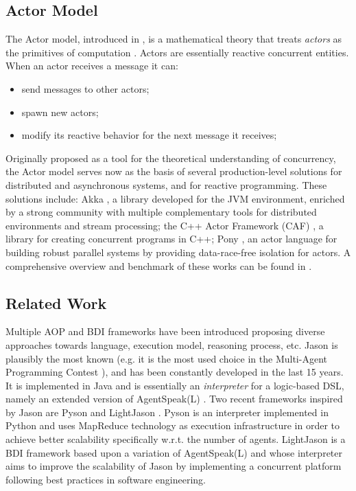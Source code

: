 \subsection{Actor Model}
The Actor model, introduced in \cite{Hewitt}, is a mathematical theory that treats \textit{actors} as the primitives of computation \cite{hewitt2010actor}. Actors are essentially reactive concurrent entities. %
When an actor receives a message it can: %
\begin{itemize}[noitemsep]
    \item send messages to other actors;
    \item spawn new actors;
    \item modify its reactive behavior for the next message it receives;
\end{itemize}
\noindent Originally proposed as a tool for the theoretical understanding of concurrency, the Actor model serves now as the basis of several production-level solutions for distributed and asynchronous systems, and for reactive programming. These solutions include: Akka \cite{AKKA}, a library developed for the JVM environment, enriched by a strong community with multiple complementary tools for distributed environments and stream processing; the C++ Actor Framework (CAF) \cite{CAF}, a library %
for creating concurrent programs in C++; Pony \cite{PONY1,PONY2}, an actor language for building robust parallel systems by providing data-race-free isolation for actors. A comprehensive overview and benchmark of these works can be found in \cite{RunActor}. 


\subsection{Related Work}
Multiple AOP and BDI frameworks have been introduced proposing diverse approaches towards language, execution model, reasoning process, etc. Jason \cite{Bordini2005} is plausibly the most known (e.g. it is the most used choice in the Multi-Agent Programming Contest \cite{mapc}), and has been constantly developed in the last 15 years. It is implemented in Java and is essentially an \textit{interpreter} for a logic-based DSL, namely an extended version of AgentSpeak(L) \cite{RaoAS1996}.  Two recent frameworks inspired by Jason are Pyson \cite{pyson} and LightJason \cite{LJ}. Pyson is an interpreter implemented in Python and uses MapReduce technology as execution infrastructure in order to achieve better scalability specifically w.r.t. the number of agents. LightJason is a BDI framework based upon a variation of AgentSpeak(L) and whose interpreter aims to improve the scalability of Jason by implementing a concurrent platform following best practices in software engineering.

